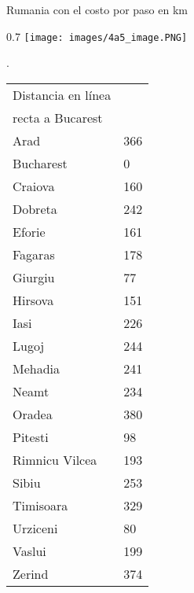 \begin{frame}{Rumania con el costo por paso en km}
\begin{wrapfigure}{}{0.7\textwidth}
\texttt{[image: images/4a5\_image.PNG]} 
\end{wrapfigure}
\tiny .\\
\begin{tabular}{l l}
Distancia en línea & \\
recta a Bucarest & \\
Arad & 366\\
Bucharest & 0\\
Craiova & 160\\
Dobreta & 242\\
Eforie & 161\\
Fagaras & 178\\
Giurgiu & 77\\
Hirsova & 151\\
Iasi & 226\\
Lugoj & 244\\
Mehadia & 241\\
Neamt & 234\\
Oradea & 380\\
Pitesti & 98\\
Rimnicu Vilcea & 193\\
Sibiu & 253\\
Timisoara & 329\\
Urziceni & 80\\
Vaslui & 199\\
Zerind & 374
\end{tabular}\\
\end{frame}{}